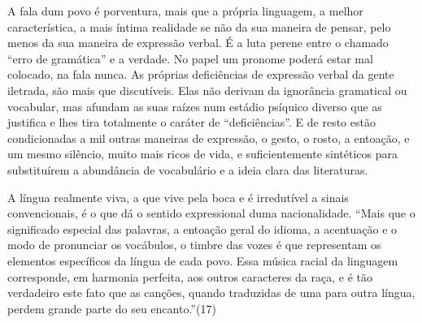 A fala dum povo é porventura, mais que a própria linguagem, a melhor
característica, a mais íntima realidade se não da sua maneira de pensar,
pelo menos da sua maneira de expressão verbal. É a luta perene entre o
chamado ``erro de gramática'' e a verdade. No papel um pronome poderá
estar mal colocado, na fala nunca. As próprias deficiências de expressão
verbal da gente iletrada, são mais que discutíveis. Elas não derivam da
ignorância gramatical ou vocabular, mas afundam as suas raízes num
estádio psíquico diverso que as justifica e lhes tira totalmente o
caráter de ``deficiências''. E de resto estão condicionadas a mil outras
maneiras de expressão, o gesto, o rosto, a entoação, e um mesmo
silêncio, muito mais ricos de vida, e suficientemente sintéticos para
substituírem a abundância de vocabulário e a ideia clara das
literaturas.

A língua realmente viva, a que vive pela boca e é irredutível a sinais
convencionais, é o que dá o sentido expressional duma nacionalidade.
``Mais que o significado especial das palavras, a entoação geral do
idioma, a acentuação e o modo de pronunciar os vocábulos, o timbre das
vozes é que representam os elementos específicos da língua de cada povo.
Essa música racial da linguagem corresponde, em harmonia perfeita, aos
outros caracteres da raça, e é tão verdadeiro este fato que as canções,
quando traduzidas de uma para outra língua, perdem grande parte do seu
encanto.''(17)

